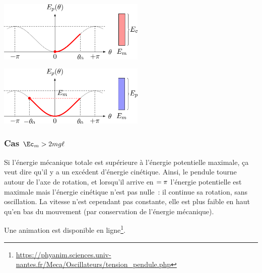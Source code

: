 \documentclass[../../main/main.tex]{subfiles}
\begin{document}
\begin{minipage}{0.45\linewidth}
	\begin{center}
		\includegraphics[width=7cm]{stab_pend-d}
	\end{center}
\end{minipage}
\hfill
\begin{minipage}{0.45\linewidth}
	\begin{center}
		\includegraphics[width=7cm]{stab_pend-e}
	\end{center}
\end{minipage}

\vspace{-15pt}
\subsubsection{Cas $\Ec_m > 2mg\ell$}
Si l'énergie mécanique totale est supérieure à l'énergie potentielle maximale,
ça veut dire qu'il y a un excédent d'énergie cinétique. Ainsi, le pendule tourne
autour de l'axe de rotation, et lorsqu'il arrive en $\tt = \pi$ l'énergie
potentielle est maximale mais l'énergie cinétique n'est pas nulle~: il continue
sa rotation, sans oscillation. La vitesse n'est cependant pas constante, elle
est plus faible en haut qu'en bas du mouvement (par conservation de l'énergie
mécanique).

Une animation est disponible en
ligne\footnote{\url{https://phyanim.sciences.univ-nantes.fr/Meca/Oscillateurs/tension_pendule.php}}.
\end{document}
